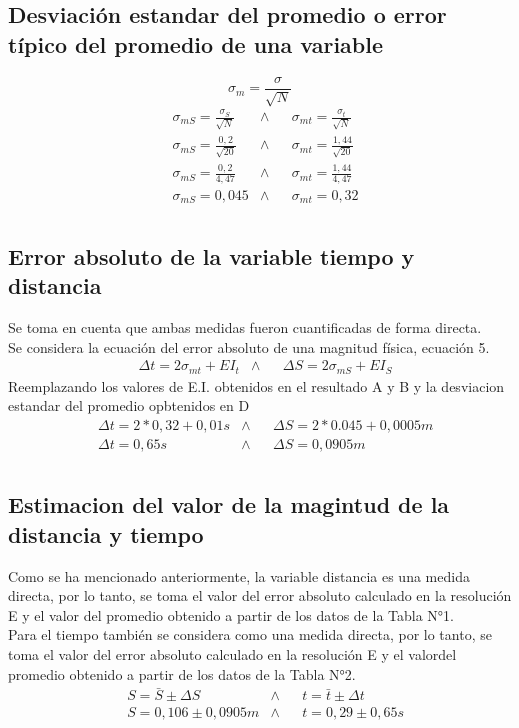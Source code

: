\documentclass[runningheads]{llncs}
\begin{document}
\subsection{Desviación estandar del promedio o error típico del promedio de una variable} 
    \begin{equation}
        \sigma_{m}=\frac{\sigma}{\sqrt{N}}
    \end{equation}
    \begin{align*}
        &\sigma_{mS}=\frac{\sigma_{S}}{\sqrt{N}}
        &\wedge&
        &\sigma_{mt}=\frac{\sigma_{t}}{\sqrt{N}}\\
        &\sigma_{mS}=\frac{0,2}{\sqrt{20}}
        &\wedge&
        &\sigma_{mt}=\frac{1,44}{\sqrt{20}}\\
        &\sigma_{mS}=\frac{0,2}{4,47}
        &\wedge&
        &\sigma_{mt}=\frac{1,44}{4,47}\\
        &\sigma_{mS}=0,045
        &\wedge&
        &\sigma_{mt}=0,32 \tag{D}\\
    \end{align*}
\subsection{Error absoluto de la variable tiempo y distancia}
Se toma en cuenta que ambas medidas fueron cuantificadas de forma directa.\\
Se considera la ecuación del error absoluto de una magnitud física, ecuación 5.\\ 
    \begin{align*}
        &\Delta t=2\sigma_{mt}+EI_{t}
        &\wedge&
        &\Delta S=2\sigma_{mS}+EI_{S}
    \end{align*}
    Reemplazando los valores de E.I. obtenidos en el resultado A y B y la desviacion estandar del promedio opbtenidos en D
    \begin{align*}
        &\Delta t=2*0,32+0,01 s
        &\wedge&
        &\Delta S=2*0.045+0,0005 m\\
        &\Delta t=0,65 s
        &\wedge&
        &\Delta S=0,0905 m \tag{E}\\
    \end{align*}
\subsection{Estimacion del valor de la magintud de la distancia y tiempo}
Como se ha mencionado anteriormente, la variable distancia es una medida directa, por lo tanto, se toma el valor del error absoluto calculado en la resolución E y el valor del promedio obtenido a partir de los datos de la Tabla N°1.\\
Para el tiempo también se considera como una medida directa, por lo tanto, se toma el valor del error absoluto calculado en la resolución E y el valordel promedio obtenido a partir de los datos de la Tabla N°2.\\
    \begin{align*}
        &S=\bar{S}\pm \Delta S
        &\wedge&
        &t=\bar{t}\pm \Delta t\\
        &S=0,106\pm 0,0905 m
        &\wedge&
        &t=0,29\pm 0,65 s \tag{F}\\
    \end{align*}
\end{document}
